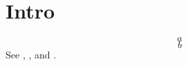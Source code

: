 \section{Intro}
\begin{equation}\label{eq:first}a\end{equation}
\begin{equation}\label{eq:second}b\end{equation}
See , , and .

